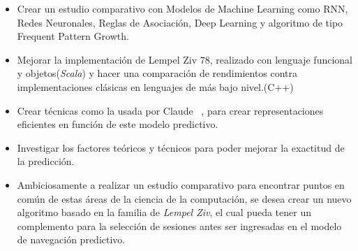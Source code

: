 \begin{itemize}

\item Crear un estudio comparativo con Modelos de Machine Learning como RNN, Redes Neuronales, Reglas de Asociación, Deep Learning y algoritmo de tipo Frequent Pattern Growth.

\item Mejorar la implementación de Lempel Ziv 78, realizado con lenguaje funcional y objetos(\emph{Scala}) y hacer una comparación de rendimientos contra implementaciones clásicas en lenguajes de más bajo nivel.(C++)


\item Crear técnicas como la usada por Claude \etal~\cite{Claude2014}, para crear representaciones eficientes en función de este modelo predictivo.


\item Investigar los factores teóricos y técnicos para poder mejorar la exactitud de la predicción.

\item Ambiciosamente a realizar un estudio comparativo para encontrar puntos en común de estas áreas de la ciencia de la computación, se desea crear un nuevo algoritmo basado en la familia de \emph{Lempel Ziv}, el cual pueda tener un complemento para la selección de sesiones antes ser ingresadas en el modelo de navegación predictivo. 


	
\end{itemize}	






 








